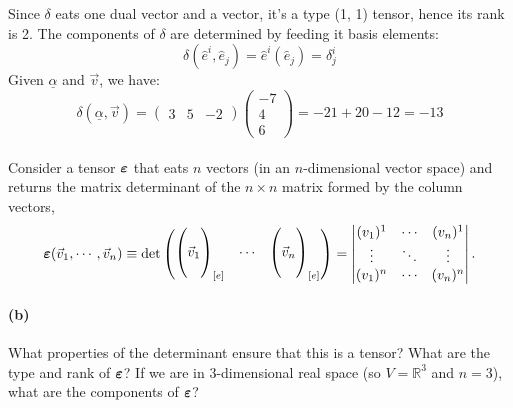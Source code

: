\documentclass{article}
\begin{document}
\begin{solution}
	Since $\delta$ eats one dual vector and a vector, it's a type (1, 1) tensor, hence its rank is 2. The 
	components of $\delta$ are determined by feeding it basis elements:
	\[
	\delta(\hat{e}^i, \hat{e}_j) = \hat{e}^i(\hat{e}_j) = \delta^i_j
	\] 
	Given $\underline\alpha$ and $\vec v$, we have:
	\[
		\delta(\underline \alpha, \vec v) = \begin{pmatrix} 3 & 5 & -2 \end{pmatrix} \begin{pmatrix} -7\\4\\6 \end{pmatrix} = -21 + 20 - 12 = -13
	\] 
\end{solution}

\phline
\paragraph{}
Consider a tensor $\boldsymbol{\varepsilon}$ that eats $n$ vectors (in an $n$-dimensional vector space) and returns the matrix determinant of the $n\times n$ matrix formed by the 
column vectors,
	\begin{equation*}
		\boldsymbol{\varepsilon}(\vec{v}_{1},\cdots,\vec{v}_{n}) \equiv \det\begin{pmatrix}\begin{pmatrix} \\ \vec{v}_{1}\\ \\ \end{pmatrix}_{[e]}&\cdots&
		\begin{pmatrix} \\ \vec{v}_{n}\\ \\ \end{pmatrix}_{[e]}\end{pmatrix}
		= \begin{vmatrix} (v_{1})^{1} & \cdots & (v_{n})^{1}\\\vdots & \ddots & \vdots \\ (v_{1})^{n} & \cdots & (v_{n})^{n}\end{vmatrix}.
	\end{equation*}

\paragraph{(b)}
What properties of the determinant ensure that this is a tensor?  What are the type and rank of $\boldsymbol{\varepsilon}$?  If we are in 3-dimensional real space 
(so $V=\mathbb{R}^{3}$ and $n=3$), what are the components of $\boldsymbol{\varepsilon}$?
\end{document}
